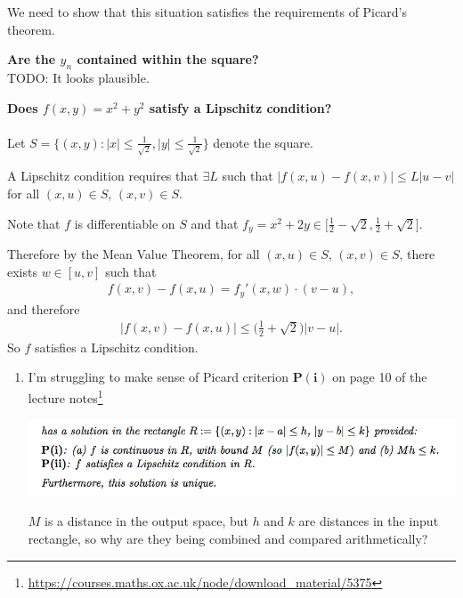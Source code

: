 \documentclass[12pt]{article}
\begin{document}
We need to show that this situation satisfies the requirements of Picard's
theorem.

\textbf{Are the $y_n$ contained within the square?}\\
TODO: It looks plausible.

\textbf{Does $f(x, y) = x^2 + y^2$ satisfy a Lipschitz condition?}\\\\
Let $S = \{(x,y): |x| \leq \frac{1}{\sqrt{2}}, |y| \leq \frac{1}{\sqrt{2}}\}$
denote the square.

A Lipschitz condition requires that $\exists L$ such that
$|f(x, u) - f(x, v)| \leq L|u - v|$ for all $(x,u) \in S$, $(x,v) \in S$.

Note that $f$ is differentiable on $S$ and that
$f_y = x^2 + 2y \in \Big[\frac{1}{2} - \sqrt{2}, \frac{1}{2} + \sqrt{2}\Big]$.

Therefore by the Mean Value Theorem, for all $(x,u) \in S$, $(x,v) \in S$,
there exists $w \in [u, v]$ such that
\begin{align*}
  f(x, v) - f(x, u) = f_y'(x, w)\cdot(v - u),
\end{align*}
and therefore
\begin{align*}
  |f(x, v) - f(x, u)| \leq \Big(\frac{1}{2} + \sqrt{2}\Big)|v - u|.
\end{align*}
So $f$ satisfies a Lipschitz condition.

\begin{enumerate}
\item I'm struggling to make sense of Picard criterion $\mathbf{P(i)}$ on page 10 of the
  lecture
  notes\footnote{\url{https://courses.maths.ox.ac.uk/node/download_material/5375}}
  \begin{mdframed}
    \includegraphics[width=400pt]{img/differential-equations-a1-picard-theorem-question.png}
  \end{mdframed}
  $M$ is a distance in the output space, but $h$ and $k$ are distances in the
  input rectangle, so why are they being combined and compared arithmetically?
\end{enumerate}
\end{document}
